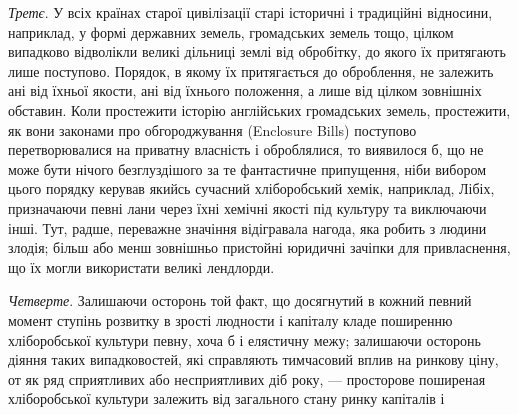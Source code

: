 \emph{Третє}. У всіх країнах старої цивілізації старі історичні і традиційні
відносини, наприклад, у формі державних земель, громадських земель тощо,
цілком випадково відволікли великі дільниці землі від обробітку, до якого їх
притягають лише поступово. Порядок, в якому їх притягається до оброблення,
не залежить ані від їхньої якости, ані від їхнього положення, а лише від цілком
зовнішніх обставин. Коли простежити історію англійських громадських земель,
простежити, як вони законами про обгороджування (Enclosure Bills) поступово перетворювалися
на приватну власність і оброблялися, то виявилося б, що не може
бути нічого безглуздішого за те фантастичне припущення, ніби вибором цього
порядку керував якийсь сучасний хліборобський хемік, наприклад, Лібіх, призначаючи
певні лани через їхні хемічні якості під культуру та виключаючи
інші. Тут, радше, переважне значіння відігравала нагода, яка робить з людини
злодія; більш або менш зовнішньо пристойні юридичні зачіпки для привласнення,
що їх могли використати великі лендлорди.

\emph{Четверте}. Залишаючи осторонь той факт, що досягнутий в кожний
певний момент ступінь розвитку в зрості людности і капіталу кладе поширенню
хліборобської культури певну, хоча б і елястичну межу; залишаючи осторонь
діяння таких випадковостей, які справляють тимчасовий вплив на ринкову
ціну, от як ряд сприятливих або несприятливих діб року, — просторове поширеная
хліборобської культури залежить від загального стану ринку капіталів і
\parbreak{}  %

